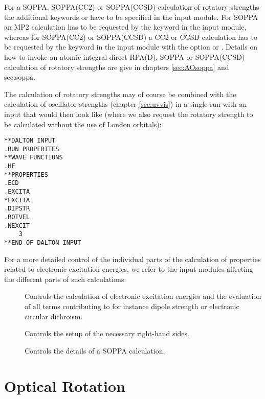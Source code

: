 For a SOPPA, SOPPA(CC2) or
SOPPA(CCSD) calculation of rotatory strengths the
additional keywords  or  have to be
specified in the  input module. For SOPPA an MP2
calculation has to be requested by the keyword  in the
 input module, whereas for SOPPA(CC2) or
SOPPA(CCSD) a CC2 or CCSD calculation has to be requested by the
keyword  in the  input module with the
 option  or . Details on how
to invoke an atomic integral direct RPA(D), SOPPA or SOPPA(CCSD)
calculation of rotatory strengths are give in chapters
\ref{sec:AOsoppa} and {sec:soppa}.


The calculation of rotatory strengths may of course be combined with
the calculation of oscillator strengths (chapter \ref{sec:uvvis}) in a
single run with an input that would then look like (where we also
request the rotatory strength to be calculated without the use of
London orbitals):

\begin{verbatim}
**DALTON INPUT
.RUN PROPERITES
**WAVE FUNCTIONS
.HF
**PROPERTIES
.ECD
.EXCITA
*EXCITA
.DIPSTR
.ROTVEL
.NEXCIT
    3
**END OF DALTON INPUT
\end{verbatim}


For a more detailed control of the individual parts of the
calculation of properties related to electronic excitation energies,
we refer to the input modules affecting the different parts of such
calculations:

\begin{description}
\item[] Controls the calculation of electronic excitation
energies and the evaluation of all terms contributing to for instance
dipole strength or electronic circular dichroism.

\item[] Controls the setup of the necessary right-hand
sides.

\item[] Controls the details of a SOPPA calculation.
\end{description}

\section{Optical Rotation}\label{sec:optrot}


